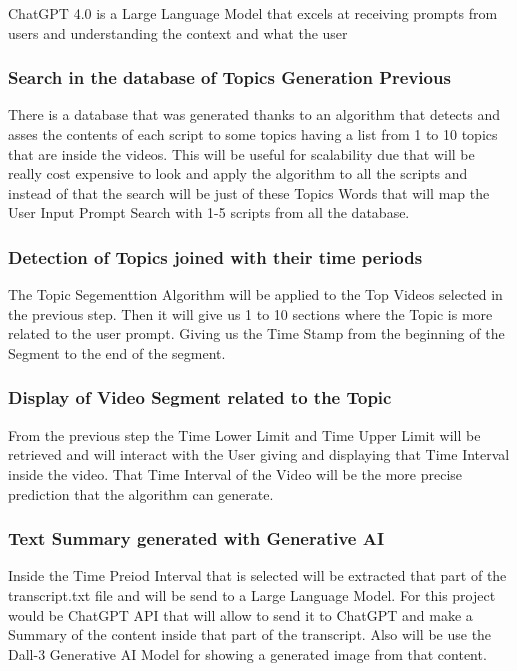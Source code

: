 ChatGPT 4.0 is a Large Language Model that excels at receiving prompts from users and understanding the context and what the user 


\subsubsection{Search in the database of Topics Generation Previous}

There is a database that was generated thanks to an algorithm that detects and asses the contents of each script to some topics having a list from 1 to 10 topics that are inside the videos. This will be useful for scalability due that will be really cost expensive to look and apply the algorithm to all the scripts and instead of that the search will be just of these Topics Words that will map the User Input Prompt Search with 1-5 scripts from all the database.


\subsubsection{Detection of Topics joined with their time periods}

The Topic Segementtion Algorithm will be applied to the Top Videos selected in the previous step. Then it will give us 1 to 10 sections where the Topic is more related to the user prompt. Giving us the Time Stamp from the beginning of the Segment to the end of the segment. 




\subsubsection{Display of Video Segment related to the Topic}

From the previous step the Time Lower Limit and Time Upper Limit will be retrieved and will interact with the User giving and displaying that Time Interval inside the video. That Time Interval of the Video will be the more precise prediction that the algorithm can generate.

\subsubsection{Text Summary generated with Generative AI}

Inside the Time Preiod Interval that is selected will be extracted that part of the transcript.txt file and will be send to a Large Language Model. For this project would be ChatGPT API that will allow to send it to ChatGPT and make a Summary of the content inside that part of the transcript. Also will be use the Dall-3 Generative AI Model for  showing a generated image from  that content.



